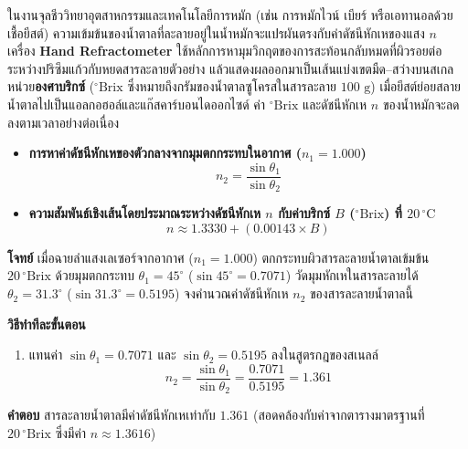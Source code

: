 ในงานจุลชีววิทยาอุตสาหกรรมและเทคโนโลยีการหมัก (เช่น การหมักไวน์ เบียร์ หรือเอทานอลด้วยเชื้อยีสต์) ความเข้มข้นของน้ำตาลที่ละลายอยู่ในน้ำหมักจะแปรผันตรงกับค่าดัชนีหักเหของแสง $n$ เครื่อง \textbf{Hand Refractometer} ใช้หลักการหามุมวิกฤตของการสะท้อนกลับหมดที่ผิวรอยต่อระหว่างปริซึมแก้วกับหยดสารละลายตัวอย่าง แล้วแสดงผลออกมาเป็นเส้นแบ่งเขตมืด--สว่างบนสเกลหน่วย\textbf{องศาบริกซ์} ($^\circ\text{Brix}$ ซึ่งหมายถึงกรัมของน้ำตาลซูโครสในสารละลาย $100\text{ g}$) เมื่อยีสต์ย่อยสลายน้ำตาลไปเป็นแอลกอฮอล์และแก๊สคาร์บอนไดออกไซด์ ค่า $^\circ\text{Brix}$ และดัชนีหักเห $n$ ของน้ำหมักจะลดลงตามเวลาอย่างต่อเนื่อง

\begin{conceptbox}
\begin{itemize}
    \item \textbf{การหาค่าดัชนีหักเหของตัวกลางจากมุมตกกระทบในอากาศ ($n_1 = 1.000$)}
    \begin{equation*}
        n_2 = \frac{\sin\theta_1}{\sin\theta_2}
    \end{equation*}
    \item \textbf{ความสัมพันธ์เชิงเส้นโดยประมาณระหว่างดัชนีหักเห $n$ กับค่าบริกซ์ $B$ ($^\circ\text{Brix}$) ที่ $20\,^\circ\text{C}$}
    \begin{equation*}
        n \approx 1.3330 + (0.00143 \times B)
    \end{equation*}
\end{itemize}
\end{conceptbox}

\begin{worked}
\textbf{โจทย์} เมื่อฉายลำแสงเลเซอร์จากอากาศ ($n_1 = 1.000$) ตกกระทบผิวสารละลายน้ำตาลเข้มข้น $20\,^\circ\text{Brix}$ ด้วยมุมตกกระทบ $\theta_1 = 45^\circ$ ($\sin 45^\circ = 0.7071$) วัดมุมหักเหในสารละลายได้ $\theta_2 = 31.3^\circ$ ($\sin 31.3^\circ = 0.5195$) จงคำนวณค่าดัชนีหักเห $n_2$ ของสารละลายน้ำตาลนี้

\textbf{วิธีทำทีละขั้นตอน}
\begin{enumerate}
    \item แทนค่า $\sin\theta_1 = 0.7071$ และ $\sin\theta_2 = 0.5195$ ลงในสูตรกฎของสเนลล์
    \begin{equation*}
        n_2 = \frac{\sin\theta_1}{\sin\theta_2} = \frac{0.7071}{0.5195} = 1.361
    \end{equation*}
\end{enumerate}
\textbf{คำตอบ} สารละลายน้ำตาลมีค่าดัชนีหักเหเท่ากับ $1.361$ (สอดคล้องกับค่าจากตารางมาตรฐานที่ $20\,^\circ\text{Brix}$ ซึ่งมีค่า $n \approx 1.3616$)
\end{worked}

